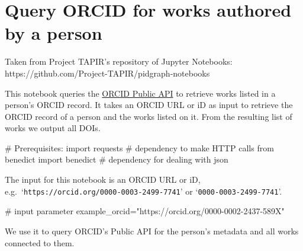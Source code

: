 \documentclass[
  letterpaper,
  DIV=11,
  numbers=noendperiod]{scrreprt}
\newenvironment{Shaded}{\begin{snugshade}}{\end{snugshade}}
\newcommand{\CommentTok}[1]{\textcolor[rgb]{0.37,0.37,0.37}{#1}}
\newcommand{\ImportTok}[1]{\textcolor[rgb]{0.00,0.46,0.62}{#1}}
\newcommand{\NormalTok}[1]{\textcolor[rgb]{0.00,0.23,0.31}{#1}}
\newcommand{\OperatorTok}[1]{\textcolor[rgb]{0.37,0.37,0.37}{#1}}
\newcommand{\StringTok}[1]{\textcolor[rgb]{0.13,0.47,0.30}{#1}}
\begin{document}

\hypertarget{query-orcid-for-works-authored-by-a-person}{%
\chapter{Query ORCID for works authored by a
person}\label{query-orcid-for-works-authored-by-a-person}}

Taken from Project TAPIR's repository of Jupyter Notebooks:
https://github.com/Project-TAPIR/pidgraph-notebooks

This notebook queries the \href{https://pub.orcid.org/v3.0/}{ORCID
Public API} to retrieve works listed in a person's ORCID record. It
takes an ORCID URL or iD as input to retrieve the ORCID record of a
person and the works listed on it. From the resulting list of works we
output all DOIs.

\begin{Shaded}
\begin{Highlighting}[]
\CommentTok{\# Prerequisites:}
\ImportTok{import}\NormalTok{ requests                        }\CommentTok{\# dependency to make HTTP calls}
\ImportTok{from}\NormalTok{ benedict }\ImportTok{import}\NormalTok{ benedict          }\CommentTok{\# dependency for dealing with json}
\end{Highlighting}
\end{Shaded}

The input for this notebook is an ORCID URL or iD,
e.g.~`\texttt{https://orcid.org/0000-0003-2499-7741}' or
`\texttt{0000-0003-2499-7741}'.

\begin{Shaded}
\begin{Highlighting}[]
\CommentTok{\# input parameter}
\NormalTok{example\_orcid}\OperatorTok{=}\StringTok{"https://orcid.org/0000{-}0002{-}2437{-}589X"}
\end{Highlighting}
\end{Shaded}

We use it to query ORCID's Public API for the person's metadata and all
works connected to them.
\end{document}
